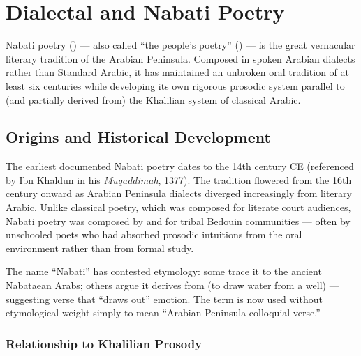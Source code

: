 \chapter{Dialectal and Nabati Poetry}
\label{ch:nabati}

Nabati poetry () — also called ``the people's poetry'' () — is the great vernacular literary tradition of the Arabian Peninsula. Composed in spoken Arabian dialects rather than Standard Arabic, it has maintained an unbroken oral tradition of at least six centuries while developing its own rigorous prosodic system parallel to (and partially derived from) the Khalilian system of classical Arabic.

\section{Origins and Historical Development}
\label{sec:nabati_history}

The earliest documented Nabati poetry dates to the 14th century CE (referenced by Ibn Khaldun in his \textit{Muqaddimah}, 1377). The tradition flowered from the 16th century onward as Arabian Peninsula dialects diverged increasingly from literary Arabic. Unlike classical poetry, which was composed for literate court audiences, Nabati poetry was composed by and for tribal Bedouin communities — often by unschooled poets who had absorbed prosodic intuitions from the oral environment rather than from formal study.

The name ``Nabati'' has contested etymology: some trace it to the ancient Nabataean Arabs; others argue it derives from  (to draw water from a well) — suggesting verse that ``draws out'' emotion. The term is now used without etymological weight simply to mean ``Arabian Peninsula colloquial verse.''

\subsection{Relationship to Khalilian Prosody}

